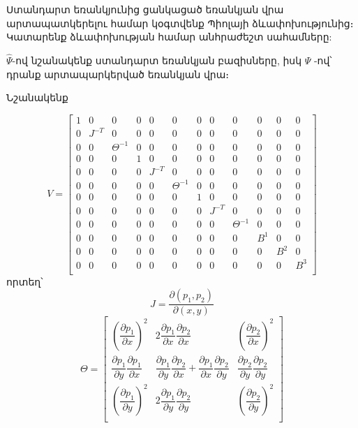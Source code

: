 \documentclass[fleqn, bachelor,subf,12pt,notitlepage]{article}
\begin{document}
Ստանդարտ եռանկյունից ցանկացած եռանկյան վրա արտապատկերելու համար կօգտվենք Պիոլայի ձևափոխությունից։ Կատարենք ձևափոխության համար անհրաժեշտ սահամները:

$\hat{\Psi}$-ով նշանակենք ստանդարտ եռանկյան բազիսները, իսկ $\Psi$ -ով՝ դրանք արտապարկերված եռանկյան վրա։

Նշանակենք

\setcounter{MaxMatrixCols}{20}
\begin{equation}
V = \begin{bmatrix}
1 & 0 & 0 & 0 & 0 & 0 & 0 & 0 & 0 & 0 & 0 & 0\\
0 & J^{-T} & 0 & 0 & 0 & 0 & 0 & 0 & 0 & 0 & 0 & 0\\
0 & 0 & \Theta^{-1} & 0 & 0 & 0 & 0 & 0 & 0 & 0 & 0 & 0\\
0 & 0 & 0 & 1 & 0 & 0 & 0 & 0 & 0 & 0 & 0 & 0\\
0 & 0 & 0 & 0 & J^{-T} & 0 & 0 & 0 & 0 & 0 & 0 & 0\\
0 & 0 & 0 & 0 & 0 & \Theta^{-1} & 0 & 0 & 0 & 0 & 0 & 0\\
0 & 0 & 0 & 0 & 0 & 0 & 1 & 0 & 0 & 0 & 0 & 0\\
0 & 0 & 0 & 0 & 0 & 0 & 0 & J^{-T} & 0 & 0 & 0 & 0\\
0 & 0 & 0 & 0 & 0 & 0 & 0 & 0 & \Theta^{-1} & 0 & 0 & 0\\
0 & 0 & 0 & 0 & 0 & 0 & 0 & 0 & 0 & B^{1} & 0 & 0\\
0 & 0 & 0 & 0 & 0 & 0 & 0 & 0 & 0 & 0 & B^{2} & 0\\
0 & 0 & 0 & 0 & 0 & 0 & 0 & 0 & 0 & 0 & 0 & B^{3}\\
\end{bmatrix}
\end{equation}
որտեղ՝
\begin{equation}
J = \dfrac{\partial \left(p_{1}, p_{2}\right)}{\partial \left(x, y\right)}
\end{equation}
\begin{equation}
\Theta = \begin{bmatrix}
						\left(\dfrac{\partial p_{1}}{\partial x}\right)^{2} & 2\dfrac{\partial p_{1}}{\partial x}\dfrac{\partial p_{2}}{\partial x} & \left(\dfrac{\partial p_{2}}{\partial x}\right)^{2}\\
						\dfrac{\partial p_{1}}{\partial y}\dfrac{\partial p_{1}}{\partial x} & \dfrac{\partial p_{1}}{\partial y}\dfrac{\partial p_{2}}{\partial x} + \dfrac{\partial p_{1}}{\partial x}\dfrac{\partial p_{2}}{\partial y} & \dfrac{\partial p_{2}}{\partial y}\dfrac{\partial p_{2}}{\partial y}\\
						\left(\dfrac{\partial p_{1}}{\partial y}\right)^{2} & 2\dfrac{\partial p_{1}}{\partial y}\dfrac{\partial p_{2}}{\partial y} & \left(\dfrac{\partial p_{2}}{\partial y}\right)^{2}\\
		\end{bmatrix}
\end{equation}
\end{document}
